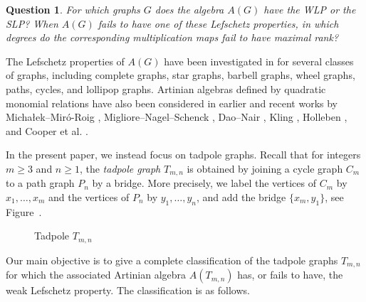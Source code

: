 \documentclass[12pt]{amsart}
\newtheorem{question}[theorem]{Question}
\begin{document}
\begin{question}\label{ques:WLP-SLP}
For which graphs $G$ does the algebra $A(G)$ have the WLP or the SLP? When $A(G)$ fails to have one of these Lefschetz properties, in which degrees do the corresponding multiplication maps fail to have maximal rank?
\end{question}

The Lefschetz properties of $A(G)$ have been investigated in  for several classes of graphs, including complete graphs, star graphs, barbell graphs, wheel graphs, paths, cycles, and lollipop graphs. Artinian algebras defined by quadratic monomial relations have also been considered in earlier and recent works by Micha{\l}ek--Mir\'o-Roig , Migliore--Nagel--Schenck , Dao--Nair , Kling , Holleben , and Cooper et al. .

In the present paper, we instead focus on tadpole graphs. Recall that for integers $m \geq 3$ and $n \geq 1$, the {\it tadpole graph} $T_{m,n}$ is obtained by joining a cycle graph $C_m$ to a path graph $P_n$ by a bridge. More precisely, we label the vertices of $C_m$ by $x_1,\ldots,x_m$ and the vertices of $P_n$ by $y_1,\ldots,y_n$, and add the bridge $\{x_m,y_1\}$, see Figure~.

\begin{figure}[htbp]
\centering
{}
\caption{Tadpole $T_{m,n}$}
\label{fig:tadpole}
\end{figure}

Our main objective is to give a complete classification of the tadpole graphs $T_{m,n}$ for which the associated Artinian algebra $A(T_{m,n})$ has, or fails to have, the weak Lefschetz property. The classification is as follows.
\end{document}
